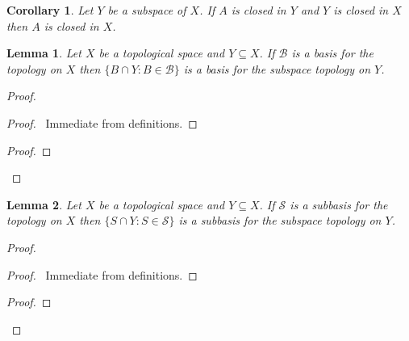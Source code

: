 \documentclass{report}
\let\qed\relax
\newtheorem{lm}{Lemma}[section]
\newtheorem{cor}{Corollary}[lm]
\theoremstyle{definition}
\begin{document}
  \begin{cor}
    \label{cor:topology:subspace:closed2}
    Let $Y$ be a subspace of $X$. If $A$ is closed in $Y$ and $Y$ is closed in
    $X$
    then $A$ is closed in $X$.
  \end{cor}

  \begin{lm}
    \label{lm:topology:subspace:basis}
    Let $X$ be a topological space and $Y \subseteq X$. If $\mathcal{B}$ is a
    basis for the topology on $X$ then $\{ B \cap Y : B \in \mathcal{B} \}$ is
    a
    basis for the subspace topology on $Y$.
  \end{lm}

  \begin{proof}
    \pf
    \begin{proof}
      \pf\ Immediate from definitions.
    \end{proof}
    \begin{proof}
    \end{proof}
    \qed
  \end{proof}

  \begin{lm}
    \label{lm:topology:subspace:subbasis}
    Let $X$ be a topological space and $Y \subseteq X$. If $\mathcal{S}$ is a
    subbasis for the topology on $X$ then $\{ S \cap Y : S \in \mathcal{S} \}$
    is
    a subbasis for the subspace topology on $Y$.
  \end{lm}

  \begin{proof}
    \pf
    \begin{proof}
      \pf\ Immediate from definitions.
    \end{proof}
    \begin{proof}
    \end{proof}
    \qed
  \end{proof}
\end{document}
